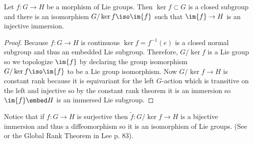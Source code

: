 \documentclass[12pt]{extarticle}
\begin{document}
\begin{prop}
Let $f : G \to H$ be a morphism of Lie groups. Then $\ker{f} \subset G$ is a closed subgroup and there is an isomorphism $G/\ker{f} \iso \im{f}$ such that $\im{f} \to H$ is an injective immersion.
\end{prop}

\begin{proof}
Because $f : G \to H$ is continuous $\ker{f} = f^{-1}(e)$ is a closed normal subgroup and thus an embedded Lie subgroup. Therefore, $G / \ker{f}$ is a Lie group so we topologize $\im{f}$ by declaring the group isomorphism $G / \ker{f} \iso \im{f}$ to be a Lie group isomorphism. Now $G / \ker{f} \to H$ is constant rank because it is equivariant for the left $G$-action which is transitive on the left and injective so by the constant rank theorem it is an immersion so $\im{f} \embed H$ is an immersed Lie subgroup. 
\end{proof}

\begin{rmk}
Notice that if $f : G \to H$ is surjective then $\tilde{f} : G / \ker{f} \to H$ is a bijective immersion and thus a diffeomorphism so it is an isomorphism of Lie groups. (See  or the Global Rank Theorem in Lee p. 83).
\end{rmk}
\end{document}
